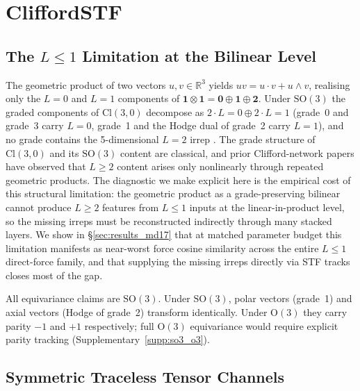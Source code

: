 \section{CliffordSTF}\label{sec:method}

\subsection{The \texorpdfstring{$L \leq 1$}{L <= 1} Limitation at the Bilinear Level}\label{sec:limitation}

The geometric product of two vectors $u, v \in \mathbb{R}^3$ yields $uv = u \cdot v + u \wedge v$, realising only the $L{=}0$ and $L{=}1$ components of $\mathbf{1} \otimes \mathbf{1} = \mathbf{0} \oplus \mathbf{1} \oplus \mathbf{2}$. Under $\mathrm{SO}(3)$ the graded components of $\mathrm{Cl}(3,0)$ decompose as $2\cdot L{=}0 \oplus 2\cdot L{=}1$ (grade~0 and grade~3 carry $L{=}0$, grade~1 and the Hodge dual of grade~2 carry $L{=}1$), and no grade contains the 5-dimensional $L{=}2$ irrep \citep{doran2003geometric,lounesto2001clifford}. The grade structure of $\mathrm{Cl}(3,0)$ and its $\mathrm{SO}(3)$ content are classical, and prior Clifford-network papers have observed that $L \geq 2$ content arises only nonlinearly through repeated geometric products. The diagnostic we make explicit here is the empirical cost of this structural limitation: the geometric product as a grade-preserving bilinear cannot produce $L \geq 2$ features from $L \leq 1$ inputs at the linear-in-product level, so the missing irreps must be reconstructed indirectly through many stacked layers. We show in \S\ref{sec:results_md17} that at matched parameter budget this limitation manifests as near-worst force cosine similarity across the entire $L \leq 1$ direct-force family, and that supplying the missing irreps directly via STF tracks closes most of the gap.

\begin{remark}\label{rem:so3_vs_o3}
All equivariance claims are $\mathrm{SO}(3)$. Under $\mathrm{SO}(3)$, polar vectors (grade~1) and axial vectors (Hodge of grade~2) transform identically. Under $\mathrm{O}(3)$ they carry parity $-1$ and $+1$ respectively; full $\mathrm{O}(3)$ equivariance would require explicit parity tracking (Supplementary~\ref{supp:so3_o3}).
\end{remark}

\subsection{Symmetric Traceless Tensor Channels}\label{sec:stf_channels}

